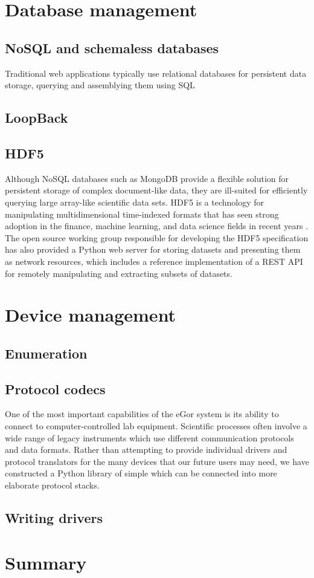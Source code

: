 \documentclass[../thesis]{subfiles}
\begin{document}
\section{Database management}

\subsection{NoSQL and schemaless databases}
Traditional web applications typically use relational databases for
persistent data storage, querying and assemblying them using \gls{SQL}

\subsection{LoopBack}

\subsection{HDF5}
Although NoSQL databases such as MongoDB provide a flexible solution
for persistent storage of complex document-like data, they are
ill-suited for efficiently querying large array-like scientific data
sets.   HDF5 is a technology for manipulating multidimensional
time-indexed formats that has seen strong adoption in the finance, machine
learning, and data science fields in recent years \cite{HDF5}. The
open source working group responsible for developing the HDF5
specification has also provided a Python web server for storing
datasets and presenting them as network resources, which includes a
reference implementation of a REST API for remotely manipulating
and extracting subsets of datasets.


\section{Device management}

\subsection{Enumeration}


\subsection{Protocol codecs}
One of the most important capabilities of the eGor system is its
ability to connect to computer-controlled lab equipment. Scientific
processes often involve a wide range of legacy instruments which use
different communication protocols and data formats. Rather than
attempting to provide individual drivers and protocol translators for
the many devices that our future users may need, we have constructed a
Python library of simple   which can be connected into more elaborate
protocol stacks.


\subsection{Writing drivers} \label{sec:DeviceDrivers}

\section{Summary}
\end{document}
